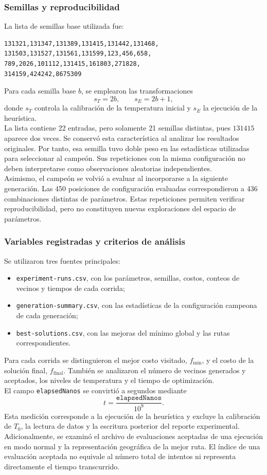 \documentclass[12pt]{article}
\begin{document}
\subsubsection{Semillas y reproducibilidad}

La lista de semillas base utilizada fue:
\begin{verbatim}
131321,131347,131389,131415,131442,131468,
131503,131527,131561,131599,123,456,658,
789,2026,101112,131415,161803,271828,
314159,424242,8675309
\end{verbatim}
Para cada semilla base $b$, se emplearon las transformaciones
\[
    s_T=2b,
    \qquad
    s_E=2b+1,
\]
donde $s_T$ controla la calibración de la temperatura inicial y $s_E$
la ejecución de la heurística.
\\
La lista contiene 22 entradas, pero solamente 21 semillas distintas,
pues $131415$ aparece dos veces. Se conservó esta característica al
analizar los resultados originales. Por tanto, esa semilla tuvo doble
peso en las estadísticas utilizadas para seleccionar al campeón.
Sus repeticiones con la misma configuración no deben interpretarse
como observaciones aleatorias independientes.
\\
Asimismo, el campeón se volvió a evaluar al incorporarse a la siguiente
generación. Las 450 posiciones de configuración evaluadas
correspondieron a 436 combinaciones distintas de parámetros. Estas
repeticiones permiten verificar reproducibilidad, pero no constituyen
nuevas exploraciones del espacio de parámetros.

\subsubsection{Variables registradas y criterios de análisis}

Se utilizaron tres fuentes principales:
\begin{itemize}
    \item \texttt{experiment-runs.csv}, con los parámetros, semillas,
    costos, conteos de vecinos y tiempos de cada corrida;
    \item \texttt{generation-summary.csv}, con las estadísticas de la
    configuración campeona de cada generación;
    \item \texttt{best-solutions.csv}, con las mejoras del mínimo global
    y las rutas correspondientes.
\end{itemize}
Para cada corrida se distinguieron el mejor costo visitado,
$f_{\min}$, y el costo de la solución final, $f_{\mathrm{final}}$.
También se analizaron el número de vecinos generados y aceptados,
los niveles de temperatura y el tiempo de optimización.
\\
El campo \texttt{elapsedNanos} se convirtió a segundos mediante
\[
    t=\frac{\texttt{elapsedNanos}}{10^9}.
\]
Esta medición corresponde a la ejecución de la heurística y excluye
la calibración de $T_0$, la lectura de datos y la escritura posterior
del reporte experimental.
\\
Adicionalmente, se examinó el archivo de evaluaciones aceptadas de
una ejecución en modo normal y la representación geográfica de la
mejor ruta. El índice de una evaluación aceptada no equivale al número
total de intentos ni representa directamente el tiempo transcurrido.
\end{document}
